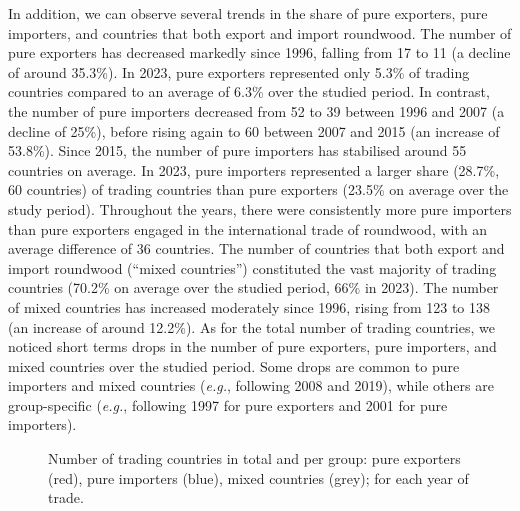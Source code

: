 \documentclass[
  authoryear,
  review,
  3p]{elsarticle}
\begin{document}
In addition, we can observe several trends in the share of pure
exporters, pure importers, and countries that both export and import
roundwood. The number of pure exporters has decreased markedly since
1996, falling from 17 to 11 (a decline of around 35.3\%). In 2023, pure
exporters represented only 5.3\% of trading countries compared to an
average of 6.3\% over the studied period. In contrast, the number of
pure importers decreased from 52 to 39 between 1996 and 2007 (a decline
of 25\%), before rising again to 60 between 2007 and 2015 (an increase
of 53.8\%). Since 2015, the number of pure importers has stabilised
around 55 countries on average. In 2023, pure importers represented a
larger share (28.7\%, 60 countries) of trading countries than pure
exporters (23.5\% on average over the study period). Throughout the
years, there were consistently more pure importers than pure exporters
engaged in the international trade of roundwood, with an average
difference of 36 countries. The number of countries that both export and
import roundwood (``mixed countries'') constituted the vast majority of
trading countries (70.2\% on average over the studied period, 66\% in
2023). The number of mixed countries has increased moderately since
1996, rising from 123 to 138 (an increase of around 12.2\%). As for the
total number of trading countries, we noticed short terms drops in the
number of pure exporters, pure importers, and mixed countries over the
studied period. Some drops are common to pure importers and mixed
countries (\emph{e.g.}, following 2008 and 2019), while others are
group-specific (\emph{e.g.}, following 1997 for pure exporters and 2001
for pure importers).

\begin{figure}[t]


\caption{\label{fig-network-composition}Number of trading countries in
total and per group: pure exporters (red), pure importers (blue), mixed
countries (grey); for each year of trade.}

\end{figure}%
\end{document}
